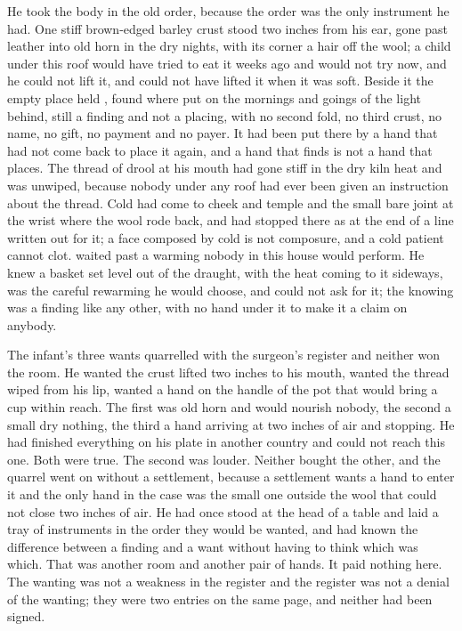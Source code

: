 He took the body in the old order, because the order was the only instrument he had. One stiff brown-edged barley crust stood two inches from his ear, gone past leather into old horn in the dry nights, with its corner a hair off the wool; a child under this roof would have tried to eat it weeks ago and would not try now, and he could not lift it, and could not have lifted it when it was soft. Beside it the empty place held , found where put on the mornings and goings of the light behind, still a finding and not a placing, with no second fold, no third crust, no name, no gift, no payment and no payer. It had been put there by a hand that had not come back to place it again, and a hand that finds is not a hand that places. The thread of drool at his mouth had gone stiff in the dry kiln heat and was unwiped, because nobody under any roof had ever been given an instruction about the thread. Cold had come to cheek and temple and the small bare joint at the wrist where the wool rode back, and had stopped there as at the end of a line written out for it; a face composed by cold is not composure, and a cold patient cannot clot.  waited past a warming nobody in this house would perform. He knew a basket set level out of the draught, with the heat coming to it sideways, was the careful rewarming he would choose, and could not ask for it; the knowing was a finding like any other, with no hand under it to make it a claim on anybody.

The infant's three wants quarrelled with the surgeon's register and neither won the room. He wanted the crust lifted two inches to his mouth, wanted the thread wiped from his lip, wanted a hand on the handle of the pot that would bring a cup within reach. The first was old horn and would nourish nobody, the second a small dry nothing, the third a hand arriving at two inches of air and stopping. He had finished everything on his plate in another country and could not reach this one. Both were true. The second was louder. Neither bought the other, and the quarrel went on without a settlement, because a settlement wants a hand to enter it and the only hand in the case was the small one outside the wool that could not close two inches of air. He had once stood at the head of a table and laid a tray of instruments in the order they would be wanted, and had known the difference between a finding and a want without having to think which was which. That was another room and another pair of hands. It paid nothing here. The wanting was not a weakness in the register and the register was not a denial of the wanting; they were two entries on the same page, and neither had been signed.

